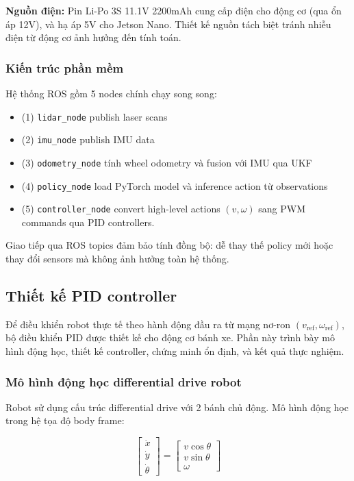 \textbf{Nguồn điện:} Pin Li-Po 3S 11.1V 2200mAh cung cấp điện cho động cơ (qua ổn áp 12V), và hạ áp 5V cho Jetson Nano. Thiết kế nguồn tách biệt tránh nhiễu điện từ động cơ ảnh hưởng đến tính toán.

\subsubsection{Kiến trúc phần mềm}

Hệ thống ROS gồm 5 nodes chính chạy song song: 
\begin{itemize}
  \item (1) \texttt{lidar\_node} publish laser scans
  \item (2) \texttt{imu\_node} publish IMU data
  \item (3) \texttt{odometry\_node} tính wheel odometry và fusion với IMU qua UKF
  \item (4) \texttt{policy\_node} load PyTorch model và inference action từ observations
  \item (5) \texttt{controller\_node} convert high-level actions $(v, \omega)$ sang PWM commands qua PID controllers.
\end{itemize}
Giao tiếp qua ROS topics đảm bảo tính đồng bộ: dễ thay thế policy mới hoặc thay đổi sensors mà không ảnh hưởng toàn hệ thống.

\subsection{Thiết kế PID controller}
\label{sec:pid_stability}

Để điều khiển robot thực tế theo hành động đầu ra từ mạng nơ-ron $(v_{\text{ref}}, \omega_{\text{ref}})$, bộ điều khiển PID được thiết kế cho động cơ bánh xe. Phần này trình bày mô hình động học, thiết kế controller, chứng minh ổn định, và kết quả thực nghiệm.

\subsubsection{Mô hình động học differential drive robot}

Robot sử dụng cấu trúc differential drive với 2 bánh chủ động. Mô hình động học trong hệ tọa độ body frame:

\begin{equation}
\begin{bmatrix}
\dot{x} \\ \dot{y} \\ \dot{\theta}
\end{bmatrix} = \begin{bmatrix}
v \cos\theta \\ v \sin\theta \\ \omega
\end{bmatrix}
\label{eq:kinematics}
\end{equation}

